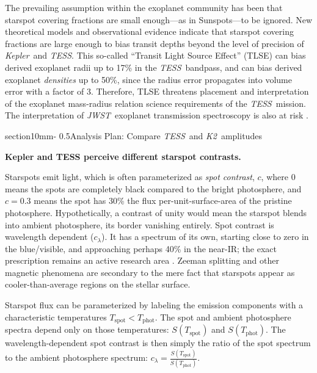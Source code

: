 \documentclass[letterpaper,12pt]{article}
\makeatletter
\renewcommand{\section}{\@startsection%
{section}{1}{0mm}{-\baselineskip}%
{0.5\baselineskip}{\normalfont\Large\bfseries}}%
\newcommand{\tess}{{\it TESS}}
\newcommand{\jwst}{{\it JWST}}
\newcommand{\kepler}{{\it Kepler}}
\newcommand{\ktwo}{{\it K2}}
\makeatother
\begin{document}
The prevailing assumption within the exoplanet community has been that starspot covering fractions are small enough---as in Sunspots---to be ignored.  New theoretical models \cite{2018ApJ...853..122R} and observational evidence \cite{2016MNRAS.463.2494F} indicate that starspot covering fractions are large enough to bias transit depths beyond the level of precision of \kepler\ and \tess.  This so-called ``Transit Light Source Effect'' (TLSE) can bias derived exoplanet radii up to 17\% in the \tess\ bandpass, and can bias derived exoplanet \emph{densities} up to 50\%, since the radius error propagates into volume error with a factor of 3.  Therefore, TLSE threatens placement and interpretation of the exoplanet mass-radius relation science requirements of the \tess\ mission.  The interpretation of \jwst\ exoplanet transmission spectroscopy is also at risk \cite{2019AJ....157...11W}.

\section{Analysis Plan: Compare \tess\ and \ktwo\ amplitudes}

\textbf{Kepler and TESS perceive different starspot contrasts.}

Starspots emit light, which is often parameterized as \emph{spot contrast}, $c$, where $0$ means the spots are completely black compared to the bright photosphere, and $c=0.3$ means the spot has 30\% the flux per-unit-surface-area of the pristine photosphere.  Hypothetically, a contrast of unity would mean the starspot blends into ambient photosphere, its border vanishing entirely.  Spot contrast is wavelength dependent ($c_\lambda$). It has a spectrum of its own, starting close to zero in the blue/visible, and approaching perhaps 40\% in the near-IR; the exact prescription remains an active research area \cite{2005LRSP....2....8B}.  Zeeman splitting and other magnetic phenomena are secondary to the mere fact that starspots appear as cooler-than-average regions on the stellar surface.  

Starspot flux can be parameterized by labeling the emission components with a characteristic temperatures $T_\text{spot}<T_\text{phot}$.  The spot and ambient photosphere spectra depend only on those temperatures: $S(T_\text{spot})$ and $S(T_\text{phot})$.  The wavelength-dependent spot contrast is then simply the ratio of the spot spectrum to the ambient photosphere spectrum:  $c_\lambda = \frac{S(T_\text{spot})}{ S(T_\text{phot})}$.
\end{document}
